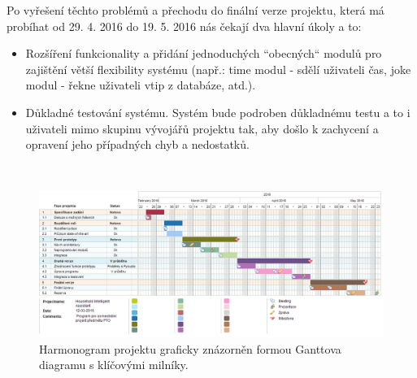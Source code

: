 \documentclass[12pt,a4paper]{article}
\begin{document}
Po vyřešení těchto problémů a přechodu do finální verze projektu, která má probíhat od 29. 4. 2016 do 19. 5. 2016 nás čekají dva hlavní úkoly a to: 
\begin{itemize}
	\item Rozšíření funkcionality a přidání jednoduchých “obecných“ modulů pro zajištění větší flexibility systému (např.: time modul - sdělí uživateli čas, joke modul - řekne uživateli vtip z databáze, atd.).
	\item Důkladné testování systému. Systém bude podroben důkladnému testu a to i uživateli mimo skupinu vývojářů projektu tak, aby došlo k zachycení a opravení jeho případných chyb a nedostatků.
\end{itemize}

\begin{landscape}
~\vfill
\begin{figure}[ht]
	\begin{center}
	\includegraphics[height = 0.6\textheight ]{PTO-Gantt.png}
	\caption{Harmonogram projektu graficky znázorněn formou Ganttova diagramu s klíčovými milníky.}
	\label{fig:diagram_gantt}
	\end{center}
\end{figure}
\vfill
\end{landscape}
\end{document}
